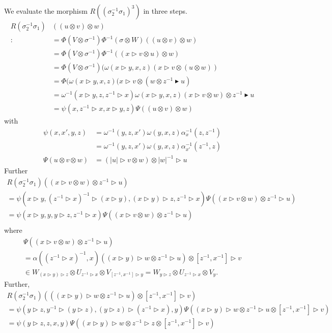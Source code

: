 \documentclass[a4paper, 10pt]{book}
\theoremstyle{definition}
\numberwithin{equation}{chapter}
\newcommand\hit{\triangleright}
\newcommand\bhit{\blacktriangleright}
\newcommand\inv{^{-1}}
\newcommand\ot{\otimes}
\begin{document}
We evaluate the morphism $R((\sigma_2\inv\sigma_1)^3)$ in three steps.
\begin{align*}
  R(\sigma_2\inv\sigma_1)&((u\ot v)\ot w)\\
                         :&=\Phi(V\ot\sigma\inv)\Phi\inv(\sigma\ot W)((u\ot v)\ot w)\\
  &=\Phi(V\ot\sigma\inv)\Phi\inv((x\hit v\ot u)\ot w)\\
  &=\Phi(V\ot\sigma\inv)(\omega(x\hit y,x,z)(x\hit v\ot(u\ot w))\\
  &=\Phi(\omega(x\hit y,x,z)(x\hit v\ot (w\ot z\inv\bhit u)\\
                         &=\omega\inv(x\hit y,z,z\inv\hit x)\omega(x\hit y,x,z)(x\hit v\ot w)\ot z\inv\bhit u\\
                         &=\psi(x,z\inv\hit x,x\hit y,z)\Psi((u\ot v)\ot w)
 \end{align*}
 with
 \begin{align*}
   \psi(x,x',y,z)&=\omega\inv(y,z,x')\omega(y,x,z)\alpha_x\inv(z,z\inv)\\
              &=\omega\inv(y,z,x')\omega(y,x,z)\alpha_{x'}\inv(z\inv,z)\\
            \Psi(u\ot v\ot w)&=(|u|\hit v\ot w)\ot |w|\inv\hit u
\end{align*}
Further
\begin{multline*}
  R(\sigma_2\inv\sigma_1)((x\hit v\ot w)\ot z\inv\hit u)\\
  =\psi(x\hit y,(z\inv\hit x)\inv\hit(x\hit y),(x\hit y)\hit z,z\inv\hit x)\Psi((x\hit v\ot w)\ot z\inv\hit u)
  \\ 
  =\psi(x\hit y,y,y\hit z,z\inv\hit x)\Psi((x\hit v\ot w)\ot z\inv\hit u)\\
\end{multline*}
where
\begin{multline*} \Psi((x\hit v\ot w)\ot z\inv\hit u)\\
  =\alpha((z\inv\hit x)\inv, x)((x\hit y)\hit w\ot z\inv\hit u)\ot [z\inv,x\inv]\hit v\\
  \in W_{(x\hit y)\hit z}\ot U_{z\inv\hit x}\ot V_{[z\inv,x\inv]\hit y}=W_{y\hit z}\ot U_{z\inv\hit x}\ot V_y.
\end{multline*}
Further,
\begin{multline*}
  R(\sigma_2\inv\sigma_1)(((x\hit y)\hit w\ot z\inv\hit u)\ot[z\inv,x\inv]\hit v)\\
  =\psi(y\hit z,y\inv\hit(y\hit z),(y\hit z)\hit(z\inv\hit x),y)\Psi((x\hit y)\hit w\ot z\inv\hit u\ot[z\inv,x\inv]\hit v)\\
  =\psi(y\hit z,z,x,y)\Psi((x\hit y)\hit w\ot z\inv\hit z\ot[z\inv,x\inv]\hit v)\\
\end{multline*}
\end{document}
